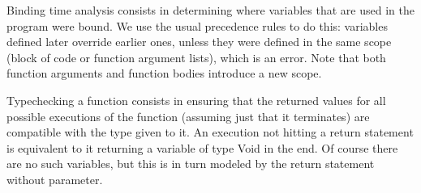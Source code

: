 \documentclass[a4paper]{article}
\begin{document}
Binding time analysis consists in determining where variables that are used in the program were bound.
We use the usual precedence rules to do this: variables defined later override earlier ones, unless they were defined in the same scope (block of code or function argument lists), which is an error.
Note that both function arguments and function bodies introduce a new scope.

Typechecking a function consists in ensuring that the returned values for all possible executions of the function (assuming just that it terminates) are compatible with the type given to it.
An execution not hitting a return statement is equivalent to it returning a variable of type Void in the end.
Of course there are no such variables, but this is in turn modeled by the return statement without parameter.
\end{document}
